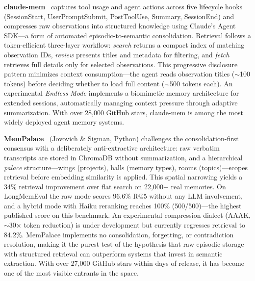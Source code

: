 \textbf{claude-mem}~\cite{newman2025claudemem} captures tool usage and
agent actions across five lifecycle hooks
(SessionStart, UserPromptSubmit, PostToolUse, Summary, SessionEnd) and
compresses raw observations into structured knowledge using Claude's
Agent SDK---a form of automated episodic-to-semantic consolidation.
Retrieval follows a token-efficient three-layer workflow:
\emph{search} returns a compact index of matching observation IDs,
\emph{review} presents titles and metadata for filtering, and
\emph{fetch} retrieves full details only for selected observations.
This progressive disclosure pattern minimizes context consumption---the
agent reads observation titles ($\sim$100 tokens) before deciding
whether to load full content ($\sim$500 tokens each).  An experimental
\emph{Endless Mode} implements a biomimetic memory architecture for
extended sessions, automatically managing context pressure through
adaptive summarization.  With over 28{,}000 GitHub stars, claude-mem is
among the most widely deployed agent memory systems.

\textbf{MemPalace}~\cite{mempalace2026} (Jovovich \& Sigman, Python)
challenges the consolidation-first consensus with a deliberately
anti-extractive architecture: raw verbatim transcripts are stored in
ChromaDB without summarization, and a hierarchical \emph{palace}
structure---wings (projects), halls (memory types), rooms
(topics)---scopes retrieval before embedding similarity is applied.
This spatial narrowing yields a 34\% retrieval improvement over flat
search on 22{,}000+ real memories.  On LongMemEval the raw mode scores
96.6\% R@5 without any LLM involvement, and a hybrid mode with Haiku
reranking reaches 100\% (500/500)---the highest published score on this
benchmark.  An experimental compression dialect (AAAK, $\sim$30$\times$
token reduction) is under development but currently regresses retrieval
to 84.2\%.  MemPalace implements no consolidation, forgetting, or
contradiction resolution, making it the purest test of the hypothesis
that raw episodic storage with structured retrieval can outperform
systems that invest in semantic extraction.  With over 27{,}000 GitHub
stars within days of release, it has become one of the most visible
entrants in the space.

